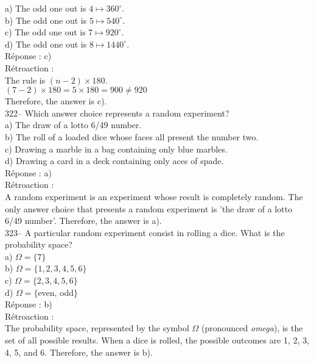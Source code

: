 \documentclass[letterpaper, 12pt]{article}
\begin{document}
a) The odd one out is $4\longmapsto 360^{\circ}$.\\
b) The odd one out is $5\longmapsto 540^{\circ}$.\\
c) The odd one out is $7\longmapsto 920^{\circ}$.\\
d) The odd one out is $8\longmapsto 1440^{\circ}$.\\

R\'eponse : c)\\

R\'etroaction : \\
The rule is $\left(n-2\right) \times 180$.\\
$\left( 7-2 \right) \times 180 = 5\times180=900\neq920$\\
Therefore, the answer is c).\\


322-- Which answer choice represents a random experiment?\\

a) The draw of a lotto 6/49 number.\\
b) The roll of a loaded dice whose faces all present the number two.\\
c) Drawing a marble in a bag containing only blue marbles.\\
d) Drawing a card in a deck containing only aces of spade.\\

R\'eponse : a)\\

R\'etroaction :\\
A random experiment is an experiment whose result is completely random. The only answer choice that
presents a random experiment is 'the draw of a lotto 6/49 number'. Therefore, the answer is a).\\

323-- A particular random experiment consist in rolling a dice. What is the probability space?\\

a) $\Omega=\{7\}$\\
b) $\Omega=\{1, 2, 3, 4, 5, 6\}$\\
c) $\Omega=\{2, 3, 4, 5, 6\}$\\
d) $\Omega=\{$even, odd$\}$\\

R\'eponse : b)\\

R\'etroaction : \\
The probability space, represented by the symbol $\Omega$ (pronounced \emph{omega}), is the set of all possible results. When a dice is rolled, the possible outcomes are 1, 2, 3, 4, 5, and 6. Therefore, the answer is b).\\
\end{document}
